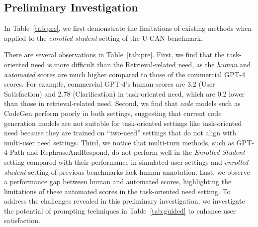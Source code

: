 \documentclass{article} %
\theoremstyle{definition}
\begin{document}
\subsection{Preliminary Investigation}
\label{subsec:preliminary}
In Table~\ref{tab:pre}, we first demonstrate the limitations of existing methods when applied to the \textit{enrolled student} setting of the U-CAN benchmark.

There are several observations in Table~\ref{tab:pre}.
First, we find that the task-oriented need is more difficult than the Retrieval-related need, as the \textit{human} and \textit{automated} scores are much higher compared to those of the commercial GPT-4 scores.
For example, commercial GPT-4's human scores are 3.2 (User Satisfaction) and 2.78 (Clarification) in task-oriented need, which are 0.2 lower than those in retrieval-related need.
Second, we find that \textit{code} models such as CodeGen perform poorly in both settings, suggesting that current code generation models are not suitable for task-oriented settings like task-oriented need because they are trained on ``two-need'' settings that do not align with multi-user need settings.
Third, we notice that multi-turn methods, such as GPT-4 Path and RephraseAndRespond, do not perform well in the \textit{Enrolled Student} setting compared with their performance in simulated user settings and \textit{enrolled student} setting of previous benchmarks lack human annotation.
Last, we observe a performance gap between human and automated scores, highlighting the limitations of these automated scores in the task-oriented need setting.
To address the challenges revealed in this preliminary investigation, we investigate the potential of prompting techniques in Table~\ref{tab:guided} to enhance user satisfaction.
\end{document}
